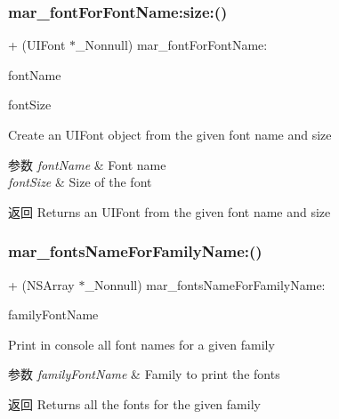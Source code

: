 \subsubsection{\texorpdfstring{mar\+\_\+font\+For\+Font\+Name\+:size\+:()}{mar\_fontForFontName:size:()}}
{\footnotesize\ttfamily + (U\+I\+Font $\ast$\+\_\+\+Nonnull) mar\+\_\+font\+For\+Font\+Name\+: \begin{DoxyParamCaption}\item[{(M\+A\+R\+Font\+Name)}]{font\+Name }\item[{size:(C\+G\+Float)}]{font\+Size }\end{DoxyParamCaption}}

Create an U\+I\+Font object from the given font name and size


\begin{DoxyParams}{参数}
{\em font\+Name} & Font name \\
\hline
{\em font\+Size} & Size of the font\\
\hline
\end{DoxyParams}
\begin{DoxyReturn}{返回}
Returns an U\+I\+Font from the given font name and size 
\end{DoxyReturn}
\mbox{\label{category_u_i_font_07_m_a_r_e_x_08_a4c584f7afd805419abed093b9afc5e36}} 
\subsubsection{\texorpdfstring{mar\+\_\+fonts\+Name\+For\+Family\+Name\+:()}{mar\_fontsNameForFamilyName:()}}
{\footnotesize\ttfamily + (N\+S\+Array $\ast$\+\_\+\+Nonnull) mar\+\_\+fonts\+Name\+For\+Family\+Name\+: \begin{DoxyParamCaption}\item[{(M\+A\+R\+Family\+Font\+Name)}]{family\+Font\+Name }\end{DoxyParamCaption}}

Print in console all font names for a given family


\begin{DoxyParams}{参数}
{\em family\+Font\+Name} & Family to print the fonts\\
\hline
\end{DoxyParams}
\begin{DoxyReturn}{返回}
Returns all the fonts for the given family 
\end{DoxyReturn}
\mbox{\label{category_u_i_font_07_m_a_r_e_x_08_a62d3d3600e1f882e3cc89d3245d80d22}} 

